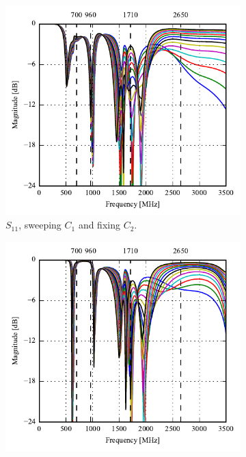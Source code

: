   \begin{figure}[htbp]
    \begin{subfigure}[b]{0.49\linewidth}
      \centering
      \includegraphics{img/tech_sol/monopole/play_mode/s11}
      \caption{$S_{11}$, sweeping $C_1$ and fixing $C_2$.}
    \end{subfigure}
    \hfill
    \begin{subfigure}[b]{0.49\linewidth}
        \centering
        \includegraphics{img/tech_sol/monopole/play_mode/s22}

\end{subfigure}
\end{figure}

